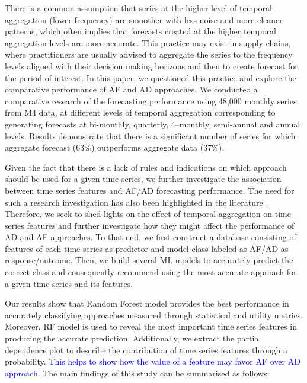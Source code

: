 \documentclass[preprint, 3p,
authoryear]{elsarticle} %
\begin{document}
There is a common assumption that series at the higher level of temporal
aggregation (lower frequency) are smoother with less noise and more
cleaner patterns, which often implies that forecasts created at the
higher temporal aggregation levels are more accurate. This practice may
exist in supply chains, where practitioners are usually advised to
aggregate the series to the frequency levels aligned with their decision
making horizons and then to create forecast for the period of interest.
In this paper, we questioned this practice and explore the comparative
performance of AF and AD approaches. We conducted a comparative research
of the forecasting performance using 48,000 monthly series from M4 data,
at different levels of temporal aggregation corresponding to generating
forecasts at bi-monthly, quarterly, 4--monthly, semi-annual and annual
levels. Results demonstrate that there is a significant number of series
for which aggregate forecast (63\%) outperforms aggregate data (37\%).

Given the fact that there is a lack of rules and indications on which
approach should be used for a given time series, we further investigate
the association between time series features and AF/AD forecasting
performance. The need for such a research investigation has also been
highlighted in the literature \citep{babai2022demand}. Therefore, we
seek to shed lights on the effect of temporal aggregation on time series
features and further investigate how they might affect the performance
of AD and AF approaches. To that end, we first construct a database
consisting of features of each time series as predictor and model class
labeled as AF/AD as response/outcome. Then, we build several ML models
to accurately predict the correct class and consequently recommend using
the most accurate approach for a given time series and its features.

Our results show that Random Forest model provides the best performance
in accurately classifying approaches measured through statistical and
utility metrics. Moreover, RF model is used to reveal the most important
time series features in producing the accurate prediction. Additionally,
we extract the partial dependence plot to describe the contribution of
time series features through a probability.
\textcolor{blue}{This helps to show how the value of a feature may favor AF over AD approach}.
The main findings of this study can be summarised as follows:
\end{document}
